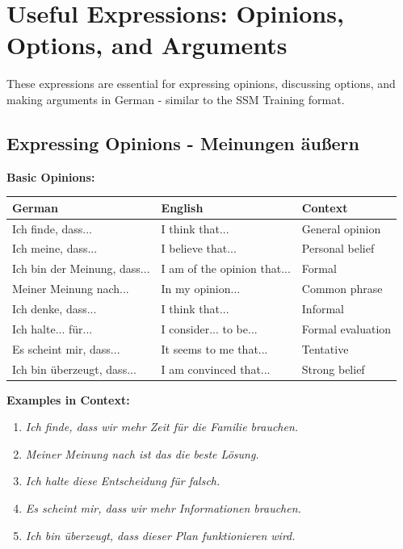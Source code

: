 \chapter{Useful Expressions: Opinions, Options, and Arguments}
\label{cha:Meinungen}

These expressions are essential for expressing opinions, discussing options, and making arguments in German - similar to the SSM Training format.

\section{Expressing Opinions - Meinungen äußern}
\label{sec:MeinungenAeusern}

\bigskip
\noindent\textbf{Basic Opinions:}
\begin{center}
\begin{tabular}{|l|p{7cm}|p{5cm}|}
\hline
German & English & Context \\ \hline
Ich finde, dass... & I think that... & General opinion \\ \hline
Ich meine, dass... & I believe that... & Personal belief \\ \hline
Ich bin der Meinung, dass... & I am of the opinion that... & Formal \\ \hline
Meiner Meinung nach... & In my opinion... & Common phrase \\ \hline
Ich denke, dass... & I think that... & Informal \\ \hline
Ich halte... für... & I consider... to be... & Formal evaluation \\ \hline
Es scheint mir, dass... & It seems to me that... & Tentative \\ \hline
Ich bin überzeugt, dass... & I am convinced that... & Strong belief \\ \hline
\end{tabular}
\end{center}

\bigskip
\noindent\textbf{Examples in Context:}

\begin{enumerate}
    \item \textit{Ich finde, dass wir mehr Zeit für die Familie brauchen.}
    \item \textit{Meiner Meinung nach ist das die beste Lösung.}
    \item \textit{Ich halte diese Entscheidung für falsch.}
    \item \textit{Es scheint mir, dass wir mehr Informationen brauchen.}
    \item \textit{Ich bin überzeugt, dass dieser Plan funktionieren wird.}
\end{enumerate}

